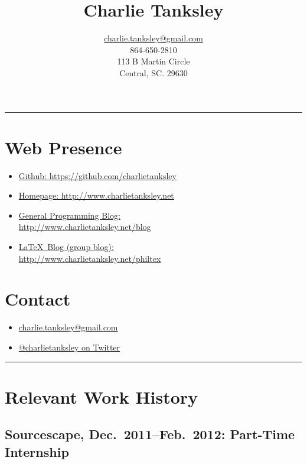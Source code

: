 \documentclass{article}
\title{Charlie Tanksley}
\author{\href{mailto:charlie.tanksley@gmail.com}{charlie.tanksley@gmail.com}\\
        864-650-2810\\
        113 B Martin Circle\\
        Central, SC. 29630}
\date{\nodate}
\begin{document}
\setlength{\droptitle}{-1in}
\maketitle
\thispagestyle{fancy}

\hrule
\begin{multicols}{2}

\section{Web Presence} %
\label{sec:Web Presence}

\begin{itemize}
  \item \href{https://github.com/charlietanksley}{Github:
    https://github.com/charlietanksley}
  \item \href{http://www.charlietanksley.net}{Homepage:
    http://www.charlietanksley.net}
  \item \href{http://www.charlietanksley.net/blog}{General Programming Blog:\\
    http://www.charlietanksley.net/blog}
  \item \href{http://www.charlietanksley.net/philtex}{\LaTeX\ Blog (group blog):\\
    http://www.charlietanksley.net/philtex}
\end{itemize}

\columnbreak
\section{Contact} %
\label{sec:Contact}

\begin{itemize}
  \item 
    \href{mailto:charlie.tanksley@gmail.com}{charlie.tanksley@gmail.com}
  \item \href{http://www.twitter.com/charlietanksley}{@charlietanksley 
    on Twitter}
\end{itemize}


\end{multicols}
\hrule
\section{Relevant Work History} %
\label{sec:Relevant Work History}

  \subsection{Sourcescape, Dec.\ 2011--Feb.\ 2012: Part-Time 
  Internship} %
  \label{sub:Sourcescape}
\end{document}
